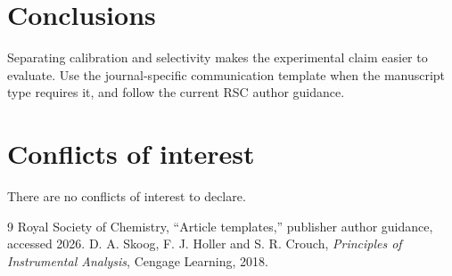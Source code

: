 \documentclass[10pt]{article}
\begin{document}
\section{Conclusions}
Separating calibration and selectivity makes the experimental claim easier to
evaluate. Use the journal-specific communication template when the manuscript
type requires it, and follow the current RSC author guidance.

\section*{Conflicts of interest}
There are no conflicts of interest to declare.

\begin{thebibliography}{9}
 Royal Society of Chemistry, ``Article templates,'' publisher
author guidance, accessed 2026.
 D. A. Skoog, F. J. Holler and S. R. Crouch,
\emph{Principles of Instrumental Analysis}, Cengage Learning, 2018.
\end{thebibliography}
\end{document}
